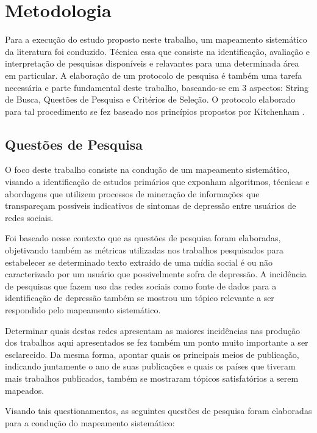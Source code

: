 \documentclass[conference]{IEEEtran}
\begin{document}
\section{Metodologia}
Para a execução do estudo proposto neste trabalho, um mapeamento sistemático da literatura foi conduzido. Técnica essa que consiste na identificação, avaliação e interpretação de pesquisas disponíveis e relavantes para uma determinada área em particular. A elaboração de um protocolo de pesquisa é também uma tarefa necessária e parte fundamental deste trabalho, baseando-se em 3 aspectos: String de Busca, Questões de Pesquisa e Critérios de Seleção. O protocolo elaborado para tal procedimento se fez baseado nos princípios propostos por Kitchenham \cite{Kitchenham}.

\subsection{Questões de Pesquisa}
O foco deste trabalho consiste na condução de um mapeamento sistemático, visando a identificação de estudos primários que exponham algoritmos, técnicas e abordagens que utilizem processos de mineração de informações que transpareçam possíveis indicativos de sintomas de depressão entre usuários de redes sociais.

Foi baseado nesse contexto que as questões de pesquisa foram elaboradas, objetivando também as métricas utilizadas nos trabalhos pesquisados para estabelecer se determinado texto extraído de uma mídia social é ou não caracterizado por um usuário que possivelmente sofra de depressão. A incidência de pesquisas que fazem uso das redes sociais como fonte de dados para a identificação de depressão também se mostrou um tópico relevante a ser respondido pelo mapeamento sistemático.

Determinar quais destas redes apresentam as maiores incidências nas produção dos trabalhos aqui apresentados se fez também um ponto muito importante a ser esclarecido. Da mesma forma, apontar quais os principais meios de publicação, indicando juntamente o ano de suas publicações e quais os países que tiveram mais trabalhos publicados, também se mostraram tópicos satisfatórios a serem mapeados.

Visando tais questionamentos, as seguintes questões de pesquisa foram elaboradas para a condução do mapeamento sistemático:
\end{document}
